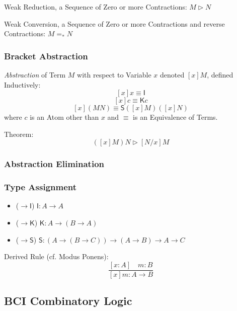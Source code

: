 Weak Reduction, a Sequence of Zero or more Contractions: $M \rhd N$

Weak Conversion, a Sequence of Zero or more Contractions and reverse
Contractions: $M =_* N$



\subsubsection{Bracket Abstraction}\label{sec:bracket_abstraction}

\emph{Abstraction} of Term $M$ with respect to Variable $x$ denoted $[x]M$,
defined Inductively:\cite{seldin03}
\[
  [x]x \equiv \mathsf{I}
\]\[
  [x]c \equiv \mathsf{K}c
\]\[
  [x](M N) \equiv \mathsf{S}([x]M)([x]N)
\]
where $c$ is an Atom other than $x$ and $\equiv$ is an Equivalence of Terms.

Theorem:
\[
  ([x]M)N \rhd [N/x]M
\]



\subsubsection{Abstraction Elimination}
\label{sec:abstraction_elimination}



\subsubsection{Type Assignment}\label{sec:combinatory_type}
\cite{seldin03}

\begin{itemize}
  \item ($\rightarrow \mathsf{I}$) $\mathsf{I}: A \rightarrow A$
  \item ($\rightarrow \mathsf{K}$)
    $\mathsf{K}: A \rightarrow (B \rightarrow A)$
  \item ($\rightarrow \mathsf{S}$)
    $\mathsf{S}: (A \rightarrow (B \rightarrow C))
      \rightarrow (A \rightarrow B) \rightarrow A \rightarrow C$
\end{itemize}

Derived Rule (cf. Modus Ponens):
\[
  \frac{
    [x:A] \quad m:B
  }{
    [x]m:A \rightarrow B
  }
\]



\subsection{BCI Combinatory Logic}\label{sec:bci_logic}

